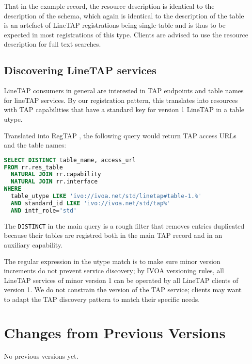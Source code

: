 \documentclass[11pt,a4paper]{ivoa}
\begin{document}
That in the example record, the resource description is identical to the
description of the schema, which again is identical to the description
of the table is an artefact of LineTAP registrations being single-table
and is thus to be expected in most registrations of this type.  Clients
are advised to use the resource description for full text searches.


\subsection{Discovering LineTAP services}

LineTAP consumers in general are interested in TAP endpoints and table names for
lineTAP services.  By our registration pattern, this translates into
resources with TAP capabilities that have a standard key for version 1
LineTAP in a table utype.

Translated into RegTAP \citep{2019ivoa.spec.1011D}, the following query
would return TAP access URLs and the table names:

\begin{lstlisting}[language=SQL]
SELECT DISTINCT table_name, access_url
FROM rr.res_table
  NATURAL JOIN rr.capability
  NATURAL JOIN rr.interface
WHERE
  table_utype LIKE 'ivo://ivoa.net/std/linetap#table-1.%'
  AND standard_id LIKE 'ivo://ivoa.net/std/tap%'
  AND intf_role='std'
\end{lstlisting}

The \texttt{DISTINCT} in the main query is a rough filter that removes
entries duplicated because their tables are registred both in the main
TAP record and in an auxiliary capability.

The regular expression in the utype match is to make sure minor version
increments do not prevent service discovery; by IVOA versioning rules,
all LineTAP services of minor version 1 can be operated by all LineTAP
clients of version 1.  We do not constrain the version of the TAP
service; clients may want to adapt the TAP discovery pattern to match
their specific needs.



\appendix
\section{Changes from Previous Versions}

No previous versions yet.



\end{document}

